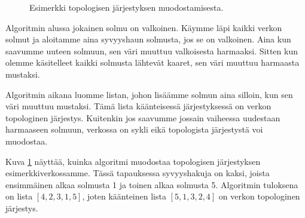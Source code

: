 \begin{figure}
\begin{center}
\end{center}
\caption{Esimerkki topologisen järjestyksen muodostamisesta.}
\label{fig:topesi}
\end{figure}


Algoritmin alussa jokainen solmu on valkoinen.
Käymme läpi kaikki verkon solmut ja aloitamme aina syvyyshaun
solmusta, jos se on valkoinen.
Aina kun saavumme uuteen solmuun, sen väri muuttuu
valkoisesta harmaaksi.
Sitten kun olemme käsitelleet kaikki solmusta lähtevät
kaaret, sen väri muuttuu harmaasta mustaksi.

Algoritmin aikana luomme listan, johon lisäämme solmun
aina silloin, kun sen väri muuttuu mustaksi.
Tämä lista käänteisessä järjestyksessä on verkon
topologinen järjestys.
Kuitenkin jos saavumme jossain vaiheessa uudestaan harmaaseen solmuun,
verkossa on sykli eikä topologista järjestystä voi muodostaa.

Kuva \ref{fig:topesi} näyttää, kuinka algoritmi muodostaa topologisen
järjestyksen esimerkkiverkossamme.
Tässä tapauksessa syvyyshakuja on kaksi,
joista ensimmäinen alkaa solmusta 1 ja toinen alkaa solmusta 5.
Algoritmin tuloksena on lista $[4,2,3,1,5]$,
joten käänteinen lista $[5,1,3,2,4]$ on verkon topologinen järjestys.

